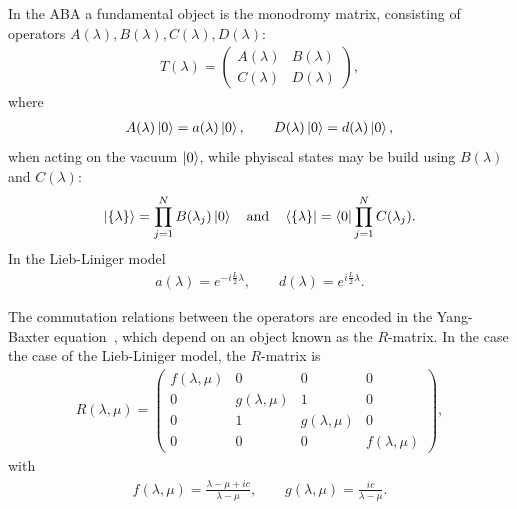 \documentclass[11pt, a4paper]{report} %
\begin{document}
In the ABA a fundamental object is the monodromy matrix, consisting of operators \(A(\lambda), B(\lambda), C(\lambda), D(\lambda)\):
\begin{align}
  \label{eq:31}
  T(\lambda) =
  \begin{pmatrix}
    A(\lambda) & B(\lambda) \\
    C(\lambda) & D(\lambda)
  \end{pmatrix},
\end{align}
where 
\begin{align}
  \label{eq:36}
  A(\lambda) \ket{0} = a(\lambda)\ket{0},\qquad D(\lambda) \ket{0} = d(\lambda)\ket{0},
\end{align}
when acting on the vacuum \(\ket{0}\), while phyiscal states may be build using \(B(\lambda)\) and \(C(\lambda)\):
\begin{align}
  \label{eq:42}
  \ket{\{\lambda\}} = \prod_{j=1}^{N} B(\lambda_j) \ket{0} \quad \mathrm{and} \quad \bra{\{\lambda\}} = \bra{0} \prod_{j=1}^N C(\lambda_j).
\end{align}
In the Lieb-Liniger model~\cite{Piroli2015}
\begin{align}
  \label{eq:43}
  a(\lambda) = e^{-i\frac{L}{2}\lambda}, \qquad d(\lambda) = e^{i\frac{L}{2}\lambda}.
\end{align}

The commutation relations between the operators are encoded in the Yang-Baxter equation~\cite{Korepin1993}, which depend on an object known as the \(R\)-matrix.
In the case the case of the Lieb-Liniger model, the \(R\)-matrix is
\begin{align}
  \label{eq:45}
  R(\lambda,\mu) = 
  \begin{pmatrix}
    f(\lambda, \mu) & 0 & 0 & 0\\
    0 & g(\lambda, \mu) & 1 & 0\\
    0 & 1 & g(\lambda, \mu) & 0 \\
    0 & 0 & 0 & f(\lambda,\mu)
  \end{pmatrix},
\end{align}
with
\begin{align}
  \label{eq:46}
  f(\lambda,\mu) = \frac{\lambda-\mu+ic}{\lambda-\mu}, \qquad g(\lambda,\mu) = \frac{ic}{\lambda-\mu}.
\end{align}
\end{document}
